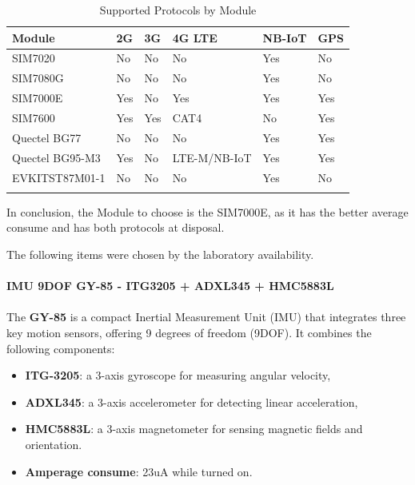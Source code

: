 \begin{table}[h!]
    \centering
    \begin{tabular}{l|l|l|l|l|l}
        \textbf{Module} & \textbf{2G} & \textbf{3G} & \textbf{4G LTE} & \textbf{NB-IoT} & \textbf{GPS} \\
        \hline
        \arrayrulecolor[gray]{0.85}
        SIM7020         & No  & No  & No           & Yes & No  \\
        \hline
        SIM7080G        & No  & No  & No           & Yes & No  \\
        \hline
        SIM7000E        & Yes & No  & Yes          & Yes & Yes \\
        \hline
        SIM7600         & Yes & Yes & CAT4         & No  & Yes \\
        \hline
        Quectel BG77    & No  & No  & No           & Yes & Yes \\
        \hline
        Quectel BG95-M3 & Yes & No  & LTE-M/NB-IoT & Yes & Yes \\
        \hline
        EVKITST87M01-1  & No  & No  & No           & Yes & No  \\
        \arrayrulecolor{black}
    \end{tabular}
    \caption{Supported Protocols by Module}
    \label{table:supported_protocols_by_module}
\end{table}
 
In conclusion, the Module to choose is the SIM7000E, as it has the better 
average consume and has both protocols at disposal.

The following items were chosen by the laboratory availability.
\\\\
\textbf{IMU 9DOF GY-85 - ITG3205 + ADXL345 + HMC5883L}
\\\\
The \textbf{GY-85} is a compact Inertial Measurement Unit (IMU) that integrates three key motion sensors, offering 9 degrees of freedom (9DOF). It combines the following components:

\begin{itemize}
    \item \textbf{ITG-3205}: a 3-axis gyroscope for measuring angular velocity,
    \item \textbf{ADXL345}: a 3-axis accelerometer for detecting linear acceleration,
    \item \textbf{HMC5883L}: a 3-axis magnetometer for sensing magnetic fields and orientation.
    \item \textbf{Amperage consume}: 23uA while turned on.
\end{itemize}

